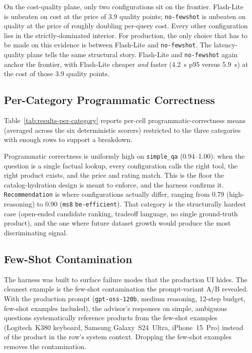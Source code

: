 On the cost-quality plane, only two configurations sit on the
frontier. Flash-Lite is unbeaten on cost at the price of 3.9
quality points; \texttt{no-fewshot} is unbeaten on quality at
the price of roughly doubling per-query cost. Every other
configuration lies in the strictly-dominated interior. For
production, the only choice that has to be made on this
evidence is between Flash-Lite and \texttt{no-fewshot}. The
latency-quality plane tells the same structural story.
Flash-Lite and \texttt{no-fewshot} again anchor the frontier,
with Flash-Lite cheaper \emph{and} faster (4.2~s p95 versus
5.9~s) at the cost of those 3.9 quality points.

\subsection{Per-Category Programmatic Correctness}
\label{subsec:results-per-category}

Table~\ref{tab:results-per-category} reports per-cell
programmatic-correctness means (averaged across the six
deterministic scorers) restricted to the three categories with
enough rows to support a breakdown.

\begin{table}[ht]
  \centering
  \footnotesize
  \resizebox{\textwidth}{!}{%
  }
  \caption{Mean programmatic correctness per category and
  configuration.}
  \label{tab:results-per-category}
\end{table}

Programmatic correctness is uniformly high on \texttt{simple\_qa}
(0.94--1.00): when the question is a single factual lookup,
every configuration calls the right tool, the right product
exists, and the price and rating match. This is the floor the
catalog-hydration design is meant to enforce, and the harness
confirms it. \texttt{Recommendation} is where configurations
actually differ, ranging from 0.79 (high-reasoning) to 0.90
(\texttt{ms8} \texttt{be-efficient}). That category is the
structurally hardest case (open-ended candidate ranking,
tradeoff language, no single ground-truth product), and the one
where future dataset growth would produce the most discriminating
signal.

\subsection{Few-Shot Contamination}
\label{subsec:results-prompt-variant}

The harness was built to surface failure modes that the
production UI hides. The cleanest example is the few-shot
contamination the prompt-variant A/B revealed. With the
production prompt (\texttt{gpt-oss-120b}, medium reasoning,
12-step budget, few-shot examples included), the advisor's
responses on simple, ambiguous questions systematically
reference products from the few-shot examples (Logitech~K380
keyboard, Samsung Galaxy~S24~Ultra, iPhone~15~Pro) instead of
the product in the row's system context. Dropping the few-shot
examples removes the contamination.

